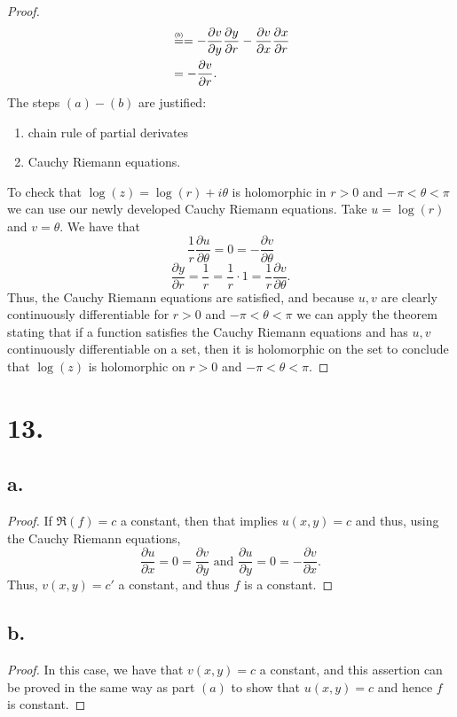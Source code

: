 \documentclass{article}
\newcommand\numeq[1]%
  {\stackrel{\scriptscriptstyle(\mkern-1.5mu#1\mkern-1.5mu)}{=}}
\begin{document}
\begin{proof}
\begin{align*}
    &\numeq{b} = -\frac{\partial v}{\partial y} \frac{\partial y}{\partial r} - \frac{\partial v}{\partial x}\frac{\partial x}{\partial r} \\
    &= -\frac{\partial v}{\partial r}.
\end{align*}
The steps $(a)-(b)$ are justified: 
\begin{enumerate}[label=(\alph*),leftmargin=2\parindent]
    \item chain rule of partial derivates
    \item Cauchy Riemann equations.
\end{enumerate}
To check that $\log(z) = \log(r) + i \theta$ is holomorphic in $r > 0$ and $-\pi < \theta < \pi$ we can use our newly developed Cauchy Riemann equations. Take $u = \log(r)$ and $v = \theta$. We have that 
\[\frac{1}{r} \frac{\partial u}{\partial \theta} = 0 = -\frac{\partial v}{\partial \theta}\]
\[
    \frac{\partial y}{\partial r} = \frac{1}{r} = \frac{1}{r}\cdot 1 = \frac{1}{r} \frac{\partial v}{\partial \theta}.\]
    Thus, the Cauchy Riemann equations are satisfied, and because $u, v$ are clearly continuously differentiable for $r > 0$ and $-\pi < \theta < \pi$ we can apply the theorem stating that if a function satisfies the Cauchy Riemann equations and has $u, v$ continuously differentiable on a set, then it is holomorphic on the set to conclude that $\log(z)$ is holomorphic on $r > 0$ and $-\pi < \theta < \pi$. 
\end{proof}

\section*{13.}
\subsection*{a.}
\begin{proof}
    If $\Re(f) = c$ a constant, then that implies $u(x, y) = c$ and thus, using the Cauchy Riemann equations, \[
        \frac{\partial u}{\partial x} = 0 = \frac{\partial v}{\partial y} \text{ and } \frac{\partial u}{ \partial y} = 0 = -\frac{\partial v}{ \partial x}.\]
        Thus, $v(x, y) = c'$ a constant, and thus $f$ is a constant. 

\end{proof}
\subsection*{b.}
\begin{proof}
    In this case, we have that $v(x, y) = c$ a constant, and this assertion can be proved in the same way as part $(a)$ to show that $u(x, y) = c$ and hence $f$ is constant. 

\end{proof}
\end{document}
